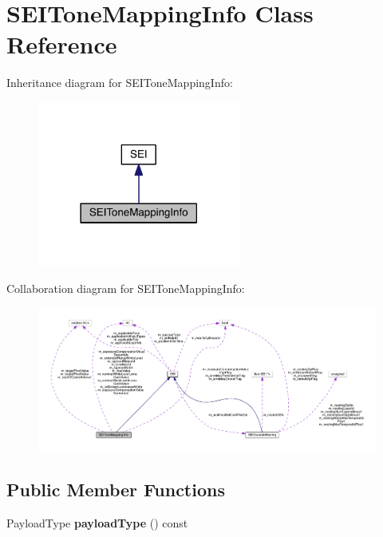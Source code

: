 \hypertarget{class_s_e_i_tone_mapping_info}{}\section{S\+E\+I\+Tone\+Mapping\+Info Class Reference}
\label{class_s_e_i_tone_mapping_info}


Inheritance diagram for S\+E\+I\+Tone\+Mapping\+Info\+:
\nopagebreak
\begin{figure}[H]
\begin{center}
\leavevmode
\includegraphics[width=189pt]{d3/d75/class_s_e_i_tone_mapping_info__inherit__graph}
\end{center}
\end{figure}


Collaboration diagram for S\+E\+I\+Tone\+Mapping\+Info\+:
\nopagebreak
\begin{figure}[H]
\begin{center}
\leavevmode
\includegraphics[width=350pt]{dc/df5/class_s_e_i_tone_mapping_info__coll__graph}
\end{center}
\end{figure}
\subsection*{Public Member Functions}
\begin{DoxyCompactItemize}
\item 
\mbox{\label{class_s_e_i_tone_mapping_info_ae023a6b1a566dd2deb1e530835b5f87e}} 
Payload\+Type {\bfseries payload\+Type} () const
\end{DoxyCompactItemize}
